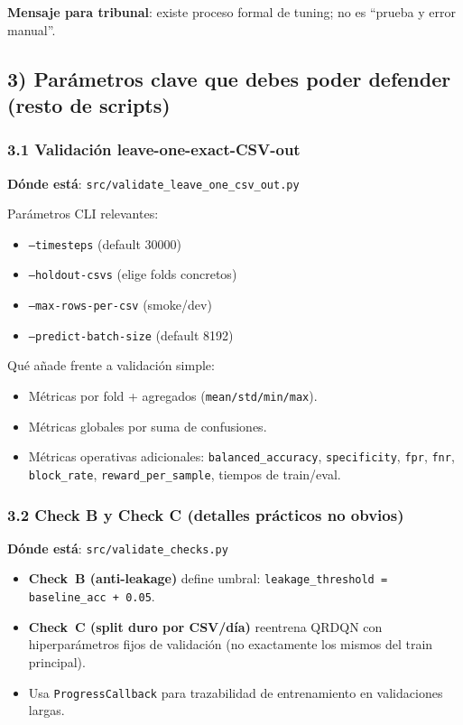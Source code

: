 ﻿\documentclass[12pt,a4paper]{article}
\begin{document}
\textbf{Mensaje para tribunal}: existe proceso formal de tuning; no es ``prueba y error manual''.

\subsection{3) Parámetros clave que debes poder defender (resto de scripts)}

\subsubsection{3.1 Validación leave-one-exact-CSV-out}

\textbf{Dónde está}: \verb|src/validate_leave_one_csv_out.py|

Parámetros CLI relevantes:

\begin{itemize}
  \item \texttt{--timesteps} (default 30000)
  \item \texttt{--holdout-csvs} (elige folds concretos)
  \item \texttt{--max-rows-per-csv} (smoke/dev)
  \item \texttt{--predict-batch-size} (default 8192)
\end{itemize}

Qué añade frente a validación simple:

\begin{itemize}
  \item Métricas por fold + agregados (\texttt{mean/std/min/max}).
  \item Métricas globales por suma de confusiones.
  \item Métricas operativas adicionales: \texttt{balanced\_accuracy}, \texttt{specificity},
        \texttt{fpr}, \texttt{fnr}, \texttt{block\_rate}, \texttt{reward\_per\_sample}, tiempos de
        train/eval.
\end{itemize}

\subsubsection{3.2 Check B y Check C (detalles prácticos no obvios)}

\textbf{Dónde está}: \verb|src/validate_checks.py|

\begin{itemize}
  \item \textbf{Check~B (anti-leakage)} define umbral:
        \texttt{leakage\_threshold = baseline\_acc + 0.05}.
  \item \textbf{Check~C (split duro por CSV/día)} reentrena QRDQN con hiperparámetros fijos de
        validación (no exactamente los mismos del train principal).
  \item Usa \texttt{ProgressCallback} para trazabilidad de entrenamiento en validaciones largas.
\end{itemize}
\end{document}
